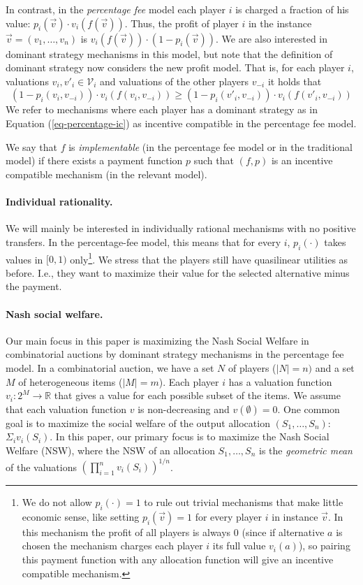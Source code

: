 \documentclass{theoretics}
\begin{document}
In contrast, in the \emph{percentage fee} model each player $i$ is charged a fraction of his value: $p_i(\overrightarrow v)\cdot v_i(f(\overrightarrow v))$. Thus, the profit of player $i$ in the instance $\overrightarrow v=(v_1,\ldots, v_n)$ is $v_i(f(\overrightarrow v))\cdot (1-p_i(\overrightarrow v))$. We are also interested in dominant strategy mechanisms in this model, but note that the definition of dominant strategy now considers the new profit model. That is, for each player $i$, valuations $v_i,v'_i\in \mathcal V_i$ and valuations of the other players $v_{-i}$ it holds that
\begin{equation}\label{eq-percentage-ic}
(1-p_i(v_i,v_{-i}))\cdot v_i(f(v_i,v_{-i})) \geq (1-p_i(v'_i,v_{-i}))\cdot v_i(f(v'_i,v_{-i}))
\end{equation}
We refer to mechanisms where each player has a dominant strategy as in Equation (\ref{eq-percentage-ic}) as incentive compatible in the percentage fee model.

We say that $f$ is \emph{implementable} (in the percentage fee model or in the traditional model) if there exists a payment function $p$ such that $(f,p)$ is an incentive compatible mechanism (in the relevant model).

\paragraph{Individual rationality.} We will mainly be interested in individually rational mechanisms with no positive transfers. In the percentage-fee model, this means that for every $i$, $p_i(\cdot)$ takes values in $[0,1)$ only\footnote{We do not allow $p_i(\cdot)=1$ to rule out trivial mechanisms that make little economic sense, like setting $p_i(\vec v)=1$ for every player $i$ in instance $\vec{v}$. In this mechanism the profit of all players is always $0$ (since if alternative $a$ is chosen the mechanism charges each player $i$ its full value $v_i(a)$), so pairing this payment function with any allocation function will give an incentive compatible mechanism.}. We stress that the players still have quasilinear utilities as before. I.e., they want to maximize their value for the selected alternative minus the payment. 

\paragraph{Nash social welfare.} Our main focus in this paper is maximizing the Nash Social Welfare in combinatorial auctions by dominant strategy mechanisms in the percentage fee model. In a combinatorial auction, we have a set $N$ of players ($|N|=n)$ and a set $M$ of heterogeneous items ($|M|=m$). Each player $i$ has a valuation function $v_i:2^M\rightarrow \mathbb R$ that gives a value for each possible subset of the items. We assume that each valuation function $v$ is non-decreasing and $v(\emptyset)=0$. One common goal is to maximize the social welfare of the output allocation $(S_1,\ldots, S_n)$: $\Sigma_iv_i(S_i)$. In this paper, our primary focus is to maximize the Nash Social Welfare (NSW), where the NSW of an allocation $S_1,\ldots, S_n$ is the {\em geometric mean} of the valuations $(\prod_{i=1}^{n} v_i(S_i))^{1/n}$.
\end{document}
